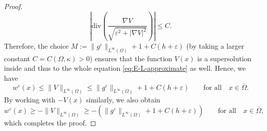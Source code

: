 \documentclass[11pt]{article}
\numberwithin{equation}{section}
\newcommand{\fix}[1]{\textcolor{red}{#1}}
\def\leq{\leqslant}
\def\geq{\geqslant}
\begin{document}
\begin{proof}
\begin{equation*}
\left|\text{div} \left( \frac{\nabla V}{\sqrt{\varepsilon^2 + |\nabla V|^2}} \right)\right| \leq C.
\end{equation*}
Therefore, the choice $M := \|g^{\varepsilon}\|_{L^{\infty}(\Omega)} + 1 + C(h + \varepsilon)$ (by taking a larger constant $C=C(\Omega,\kappa)>0$) ensures that the function $V(x)$ is a supersolution inside and thus to the whole equation \eqref{eq:E-L-approximate} as well. Hence, we have
$$
w^{\varepsilon}(x) \leq \|V\|_{L^{\infty}(\Omega)} \leq \|g^{\varepsilon}\|_{L^{\infty}(\Omega)} + 1 + C(h+\varepsilon)\qquad\text{for all}\quad x\in\overline{\Omega}.
$$
By working with $-V(x)$ similarly, we also obtain
$$
w^{\varepsilon}(x) \geq -\|V\|_{L^{\infty}(\Omega)} \geq -(\|g^{\varepsilon}\|_{L^{\infty}(\Omega)} + 1 + C(h+\varepsilon))\qquad\text{for all}\quad x\in\overline{\Omega},
$$
which completes the proof.
\end{proof}
\end{document}
